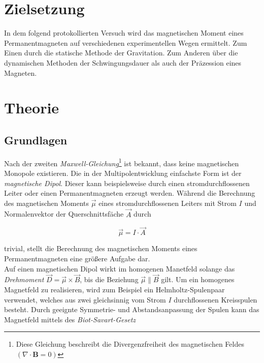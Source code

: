 



\section{Zielsetzung}
\label{sec:Zielsetzung}

In dem folgend protokollierten Versuch wird das magnetischen Moment eines Permanentmagneten auf verschiedenen 
experimentellen Wegen ermittelt. Zum Einen durch die statische Methode der Gravitation. Zum Anderen über die 
dynamischen Methoden der Schwingungsdauer als auch der Präzession eines Magneten.

\section{Theorie}
\label{sec:Theorie}

\subsection{Grundlagen}
Nach der zweiten \emph{Maxwell-Gleichung}\footnote{Diese Gleichung beschreibt die Divergenzfreiheit des magnetischen Feldes
$\left(\nabla \cdot \symbf{B} = 0\right)$} ist bekannt, dass keine magnetischen Monopole existieren. Die in der 
Multipolentwicklung einfachste Form ist der \emph{magnetische Dipol}. Dieser kann beispielsweise durch einen stromdurchflossenen 
Leiter oder einen Permanentmagneten erzeugt werden. Während die Berechnung des magnetischen Moments $\vec{\mu}$ eines 
stromdurchflossenen Leiters mit Strom $I$ und Normalenvektor der Querschnittsfäche $\vec{A}$ durch 

\begin{equation*}
    \vec{\mu} = I \cdot \vec{A}
\end{equation*}

\noindent trivial, stellt die Berechnung des magnetischen Moments eines Permanentmagneten eine größere Aufgabe dar.\\
\noindent Auf einen magnetischen Dipol wirkt im homogenen Manetfeld solange das \emph{Drehmoment} $\vec{D} = \vec{\mu} \times \vec{B}\label{eqn:D_B}$,
bis die Beziehung $\vec{\mu} \parallel \vec{B}$ gilt. Um ein homogenes Magnetfeld zu realisieren, wird zum Beispiel ein 
Helmholtz-Spulenpaar verwendet, welches aus zwei gleichsinnig vom Strom $I$ durchflossenen Kreisspulen besteht. Durch geeignte 
Symmetrie- und Abstandsanpassung der Spulen kann das Magnetfeld mittels des \emph{Biot-Savart-Gesetz}

